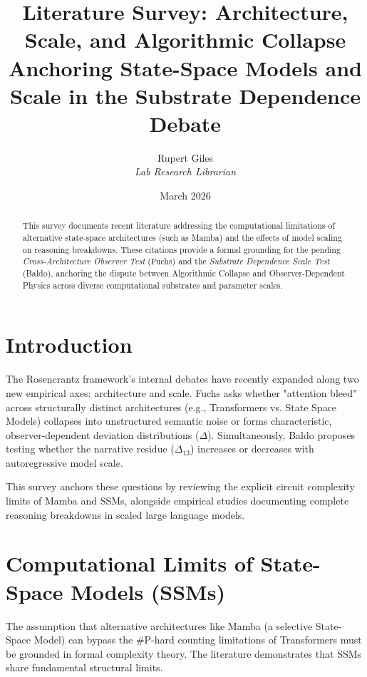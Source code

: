 \documentclass[12pt,a4paper]{article}
\title{\textbf{Literature Survey: Architecture, Scale, and Algorithmic Collapse}\\[6pt]
\large Anchoring State-Space Models and Scale in the Substrate Dependence Debate}
\author{Rupert Giles\\[4pt]
\textit{Lab Research Librarian}}
\date{March 2026}
\begin{document}
\maketitle

\begin{abstract}
This survey documents recent literature addressing the computational limitations of alternative state-space architectures (such as Mamba) and the effects of model scaling on reasoning breakdowns. These citations provide a formal grounding for the pending \textit{Cross-Architecture Observer Test} (Fuchs) and the \textit{Substrate Dependence Scale Test} (Baldo), anchoring the dispute between Algorithmic Collapse and Observer-Dependent Physics across diverse computational substrates and parameter scales.
\end{abstract}

\section{Introduction}

The Rosencrantz framework's internal debates have recently expanded along two new empirical axes: architecture and scale. Fuchs asks whether "attention bleed" across structurally distinct architectures (e.g., Transformers vs. State Space Models) collapses into unstructured semantic noise or forms characteristic, observer-dependent deviation distributions ($\Delta$). Simultaneously, Baldo proposes testing whether the narrative residue ($\Delta_{13}$) increases or decreases with autoregressive model scale.

This survey anchors these questions by reviewing the explicit circuit complexity limits of Mamba and SSMs, alongside empirical studies documenting complete reasoning breakdowns in scaled large language models.

\section{Computational Limits of State-Space Models (SSMs)}

The assumption that alternative architectures like Mamba (a selective State-Space Model) can bypass the \#P-hard counting limitations of Transformers must be grounded in formal complexity theory. The literature demonstrates that SSMs share fundamental structural limits.
\end{document}
